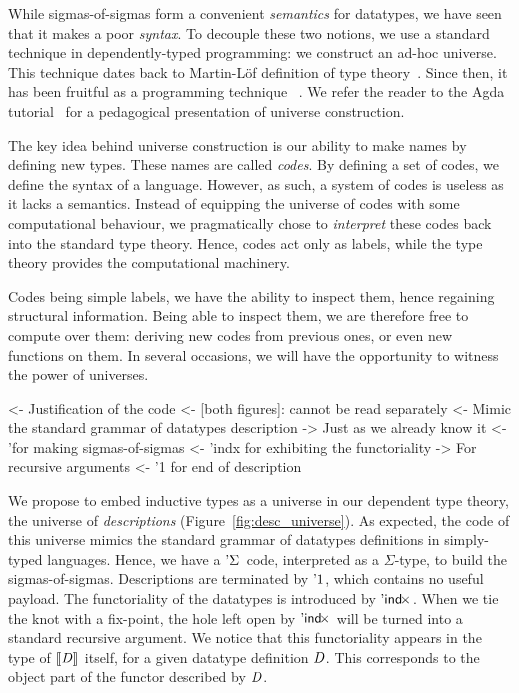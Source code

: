 While sigmas-of-sigmas form a convenient \emph{semantics} for
datatypes, we have seen that it makes a poor \emph{syntax}. To
decouple these two notions, we use a standard technique in
dependently-typed programming: we construct an ad-hoc universe. This
technique dates back to Martin-L\"of definition of type
theory~\cite{martin-lof:itt}. Since then, it has been fruitful as a
programming technique~\cite{benke:universe-generic-prog,
  oury:power-of-pi} .  We refer the
reader to the Agda tutorial~\cite{norell:agda-tutorial} for a
pedagogical presentation of universe construction.    


The key idea behind universe construction is our ability to make names
by defining new types. These names are called \emph{codes}. By
defining a set of codes, we define the syntax of a language. However,
as such, a system of codes is useless as it lacks a semantics. Instead
of equipping the universe of codes with some computational behaviour,
we pragmatically chose to \emph{interpret} these codes back into the
standard type theory. Hence, codes act only as labels, while the type
theory provides the computational machinery. 

Codes being simple labels, we have the ability to inspect them, hence
regaining structural information. Being able to inspect them, we are
therefore free to compute over them: deriving new codes from previous
ones, or even new functions on them. In several occasions, we will
have the opportunity to witness the power of universes.

\begin{wstructure}
<- Justification of the code 
    <- [both figures]: cannot be read separately
    <- Mimic the standard grammar of datatypes description
        -> Just as we already know it
        <- '\Sigma for making sigmas-of-sigmas
        <- 'indx for exhibiting the functoriality
            -> For recursive arguments
        <- '1 for end of description
\end{wstructure}

We propose to embed inductive types as a universe in our dependent
type theory, the universe of \emph{descriptions}
(Figure~\ref{fig:desc_universe}). As expected, the code of this
universe mimics the standard grammar of datatypes definitions in
simply-typed languages. Hence, we have a $\DSigma{\!}{\!}$ code,
interpreted as a $\Sigma$-type, to build the
sigmas-of-sigmas. Descriptions are terminated by $\DUnit$, which
contains no useful payload. The functoriality of the datatypes is
introduced by $\DIndx{\!}$. When we tie the knot with a fix-point, the
hole left open by $\DIndx{\!}$ will be turned into a standard
recursive argument. We notice that this functoriality appears in the
type of $\descop{\V{D}}{\!}$ itself, for a given datatype definition
$\V{D}$. This corresponds to the object part of the functor described
by $\V{D}$.

